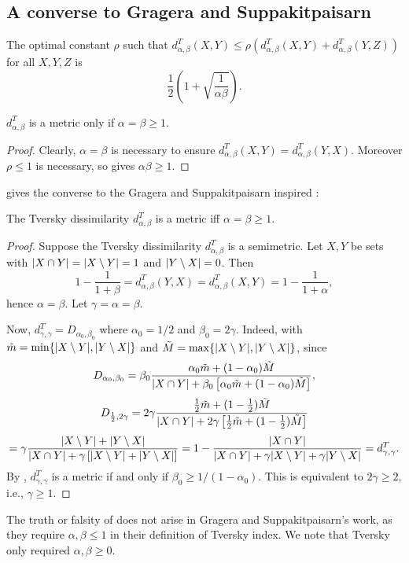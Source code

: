 	\subsection{A converse to Gragera and Suppakitpaisarn}
		\begin{theorem}\label{nother}
			 The optimal constant $\rho$ such that $d^T_{\alpha,\beta}(X,Y)\le \rho(d^T_{\alpha,\beta}(X,Y)+d^T_{\alpha,\beta}(Y,Z))$ for all $X,Y,Z$
			 is
			\[
				\frac12\left(1+\sqrt{\frac{1}{\alpha\beta}}\right).
			\]
		\end{theorem}
		\begin{corollary}\label{GScor}
			$d^T_{\alpha,\beta}$ is a metric only if $\alpha=\beta\ge 1$.
		\end{corollary}
		\begin{proof}
			Clearly, $\alpha=\beta$ is necessary to ensure $d^T_{\alpha,\beta}(X,Y)=d^T_{\alpha,\beta}(Y,X)$.
			Moreover $\rho\le 1$ is necessary, so  gives $\alpha\beta\ge 1$.
		\end{proof}
		 gives the converse to the Gragera and Suppakit\-paisarn inspired :
		\begin{theorem}\label{cool}
			The Tversky dissimilarity $d^T_{\alpha,\beta}$ is a metric iff $\alpha=\beta\ge 1$.
		\end{theorem}
		\begin{proof}
			Suppose the Tversky dissimilarity $d^T_{\alpha,\beta}$ is a semimetric.
			Let $X,Y$ be sets with $\lvert X\cap Y\rvert=\lvert X\setminus Y\rvert=1$ and $\lvert Y\setminus X\rvert=0$.
			Then
			\[
				1-\frac1{1+\beta} = d^T_{\alpha,\beta}(Y,X) = d^T_{\alpha,\beta}(X,Y)=1-\frac{1}{1+\alpha},
			\]
			hence $\alpha=\beta$. Let $\gamma=\alpha=\beta$.


			Now, $d^T_{\gamma,\gamma}=D_{\alpha_0,\beta_0}$ where $\alpha_0=1/2$ and $\beta_0 = 2\gamma$. Indeed, with 
			$\tilde m=\min\{\lvert X\setminus Y\rvert, \lvert Y\setminus X\rvert\}$ and $\tilde M=\max\{\lvert X\setminus Y\rvert, \lvert Y\setminus X\rvert\}$, since
			\[
				D_{\alpha_0,\beta_0} = \beta_0\frac{
					\alpha_0 \tilde m + (1-\alpha_0)\tilde M
				}{
					\lvert X\cap Y\rvert + \beta_0\left[\alpha_0 \tilde m + (1-\alpha_0)\tilde M\right]
				},
			\]
			\[
				D_{\frac12,2\gamma} = 2\gamma\frac{
					\frac12 \tilde m + (1-\frac12)\tilde M
				}{
					\lvert X\cap Y\rvert + 2\gamma\left[\frac12 \tilde m + (1-\frac12)\tilde M\right]
				}
			\]
			\[
			= \gamma\frac{
					\lvert X\setminus Y\rvert+\lvert Y\setminus X\rvert
							}{
								\lvert X\cap Y\rvert + \gamma\left[\lvert X\setminus Y\rvert+\lvert Y\setminus X\rvert\right]
							}
				= 1 - \frac{\lvert X \cap Y\rvert}{\lvert X \cap Y\rvert + \gamma\lvert X \setminus Y\rvert + \gamma\lvert Y \setminus X\rvert} = d^T_{\gamma,\gamma}.
			\]
			By , $d^T_{\gamma,\gamma}$ is a metric if and only if $\beta_0\ge 1/(1-\alpha_0)$.
			This is equivalent to $2\gamma \ge 2$, i.e., $\gamma\ge 1$.
		\end{proof}
		The truth or falsity of  does not arise in Gragera and Suppakit\-paisarn's work,
		as they require $\alpha,\beta\le 1$ in their definition of Tversky index.
		We note that Tversky \cite{tversky} only required $\alpha,\beta\ge 0$.

